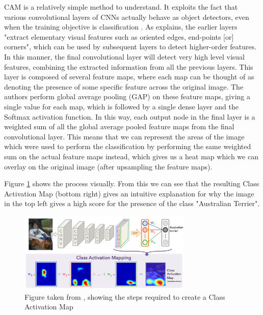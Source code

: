 \documentclass[conference,onecolumn]{IEEEtran}
\begin{document}
CAM is a relatively simple method to understand. It exploits the fact that various convolutional layers of CNNs actually behave as object detectors, even when the training objective is classification \cite{cam}. As \cite{lenet5} explains, the earlier layers "extract elementary visual features such as oriented edges, end-points [or] corners", which can be used by subsequent layers to detect higher-order features. In this manner, the final convolutional layer will detect very high level visual features, combining the extracted information from all the previous layers. This layer is composed of several feature maps, where each map can be thought of as denoting the presence of some specific feature across the original image. The authors perform global average pooling (GAP) on these feature maps, giving a single value for each map, which is followed by a single dense layer and the Softmax activation function. In this way, each output node in the final layer is a weighted sum of all the global average pooled feature maps from the final convolutional layer. This means that we can represent the areas of the image which were used to perform the classification by performing the same weighted sum on the actual feature maps instead, which gives us a heat map which we can overlay on the original image (after upsampling the feature maps).

Figure \ref{camimg} shows the process visually. From this we can see that the resulting Class Activation Map (bottom right) gives an intuitive explanation for why the image in the top left gives a high score for the presence of the class "Australian Terrier".

\begin{figure}[h]
\centerline{\includegraphics[width=3.25in]{figure/cam.pdf}}
\caption{Figure taken from \cite{cam}, showing the steps required to create a Class Activation Map}
\label{camimg}
\end{figure}
\end{document}

